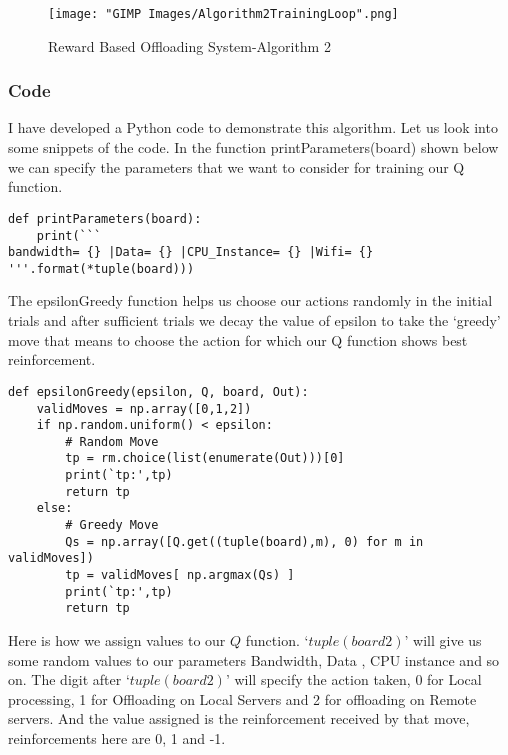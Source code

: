 \documentclass[12pt]{report}
\begin{document}
\begin{figure}[h]
  \centering
  \texttt{[image: "GIMP Images/Algorithm2TrainingLoop".png]}
  \caption{Reward Based Offloading System-Algorithm 2}
  \label{fig:Algorithm2TrainingLoop}
\end{figure}
\subsubsection{Code}
I have developed a Python code to demonstrate this algorithm. Let us look into some snippets of the code. In the function printParameters(board) shown below we can specify the parameters that we want to consider for training our Q function.
\begin{small}
\begin{lstlisting}
def printParameters(board):
    print(```
bandwidth= {} |Data= {} |CPU_Instance= {} |Wifi= {}
'''.format(*tuple(board)))
\end{lstlisting}
\end{small}

The epsilonGreedy function helps us choose our actions randomly in the initial trials and after sufficient trials we decay the value of epsilon to take the `greedy' move that means to choose the action for which our Q function shows best reinforcement.
\begin{small}
\begin{lstlisting}
def epsilonGreedy(epsilon, Q, board, Out):
    validMoves = np.array([0,1,2])
    if np.random.uniform() < epsilon:
        # Random Move
        tp = rm.choice(list(enumerate(Out)))[0]
        print(`tp:',tp)
        return tp
    else:
        # Greedy Move
        Qs = np.array([Q.get((tuple(board),m), 0) for m in validMoves])
        tp = validMoves[ np.argmax(Qs) ] 
        print(`tp:',tp)
        return tp
\end{lstlisting}
\end{small}

Here is how we assign values to our $Q$ function. `$tuple(board2)$' will give us some random values to our parameters Bandwidth, Data , CPU instance and so on. The digit after `$tuple(board2)$' will specify the action taken, 0 for Local processing, 1 for Offloading on Local Servers and 2 for offloading on Remote servers. And the value assigned is the reinforcement received by that move, reinforcements here are 0, 1 and -1.
\end{document}
